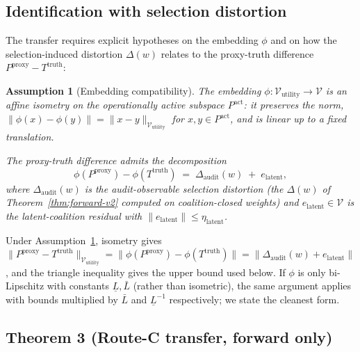 \documentclass{article}
\newtheorem{assumption}{Assumption}
\newcommand{\Pproxy}{P^{\mathrm{proxy}}}
\newcommand{\Ttruth}{T^{\mathrm{truth}}}
\begin{document}
\subsection{Identification with selection distortion}

The transfer requires explicit hypotheses on the embedding $\phi$
and on how the selection-induced distortion $\Delta(w)$ relates
to the proxy-truth difference $\Pproxy - \Ttruth$:

\begin{assumption}[Embedding compatibility]
\label{ass:embedding}
The embedding $\phi: \mathcal{V}_\mathrm{utility} \to \mathcal{V}$
is an \emph{affine isometry} on the operationally active subspace
$P^\mathrm{act}$: it preserves the norm, $\|\phi(x) - \phi(y)\| =
\|x - y\|_{\mathcal{V}_\mathrm{utility}}$ for $x, y \in
P^\mathrm{act}$, and is linear up to a fixed translation.

The proxy-truth difference admits the decomposition
\begin{equation}
\label{eq:embedding-decomp}
  \phi(\Pproxy) - \phi(\Ttruth) \;=\; \Delta_\mathrm{audit}(w)
  \;+\; e_\mathrm{latent},
\end{equation}
where $\Delta_\mathrm{audit}(w)$ is the audit-observable selection
distortion (the $\Delta(w)$ of Theorem~\ref{thm:forward-v2}
computed on coalition-closed weights) and $e_\mathrm{latent} \in
\mathcal{V}$ is the latent-coalition residual with
$\|e_\mathrm{latent}\| \leq \eta_\mathrm{latent}$.
\end{assumption}

Under Assumption~\ref{ass:embedding}, isometry gives
$\|\Pproxy - \Ttruth\|_{\mathcal{V}_\mathrm{utility}} = \|\phi(\Pproxy)
- \phi(\Ttruth)\| = \|\Delta_\mathrm{audit}(w) + e_\mathrm{latent}\|$,
and the triangle inequality gives the upper bound used below.  If
$\phi$ is only bi-Lipschitz with constants $\underline{L}, \bar{L}$
(rather than isometric), the same argument applies with bounds
multiplied by $\bar{L}$ and $\underline{L}^{-1}$ respectively; we
state the cleanest form.

\subsection{Theorem 3 (Route-C transfer, forward only)}
\end{document}
